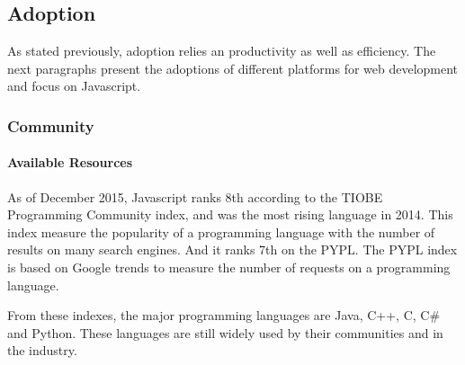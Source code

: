 
\subsection{Adoption} \label{chapter3:software-productivity:adoption}

As stated previously, adoption relies an productivity as well as efficiency.
The next paragraphs present the adoptions of different platforms for web development and focus on Javascript.

\begin{figure}[h!]
%
\end{figure}

\subsubsection{Community}%
\paragraph{Available Resources}%
As of December 2015, Javascript ranks 8th according to the TIOBE Programming Community index, and was the most rising language in 2014.
This index measure the popularity of a programming language with the number of results on many search engines.
And it ranks 7th on the PYPL.
The PYPL index is based on Google trends to measure the number of requests on a programming language.

From these indexes, the major programming languages are Java, C++, C, C\# and Python.
These languages are still widely used by their communities and in the industry.

\begin{figure}[h!]
\end{figure}

